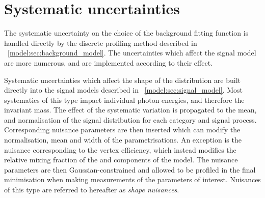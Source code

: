 

\section{Systematic uncertainties}
\label{model:sec:systematics}

The systematic uncertainty on the choice of the background fitting function is handled directly by the discrete profiling method described in \Sec~\ref{model:sec:background_model}. The uncertainties which affect the signal model are more numerous, and are implemented according to their effect.

Systematic uncertainties which affect the shape of the \mgg distribution are built directly into the signal models described in \Sec~\ref{model:sec:signal_model}. Most systematics of this type impact individual photon energies, and therefore the invariant mass. The effect of the systematic variation is propagated to the mean, \effSigma and normalisation of the signal \mgg distribution for each category and signal process. Corresponding nuisance parameters are then inserted which can modify the normalisation, mean and width of the \DCBpG parametrisations. An exception is the nuisance corresponding to the vertex efficiency, which instead modifies the relative mixing fraction of the \RV and \WV components of the model. The nuisance parameters are then Gaussian-constrained and allowed to be profiled in the final \NLL minimisation when making measurements of the parameters of interest. Nuisances of this type are referred to hereafter as \emph{shape nuisances}. 

